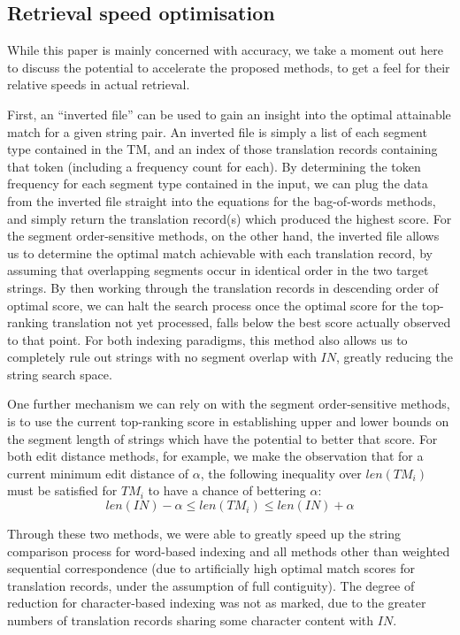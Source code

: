 \subsection{Retrieval speed optimisation}
\label{sec:speed}

While this paper is mainly concerned with accuracy, we take a moment out
here to discuss the potential to accelerate the proposed methods, to get a
feel for their relative speeds in actual retrieval.

First, an ``inverted file'' can be used to gain an insight into the
optimal attainable match for a given string pair. An inverted file is
simply a list of each segment type contained in the TM, and an index of
those translation records containing that token (including a frequency
count for each). By determining the token frequency for each segment
type contained in the input, we can plug the data from the inverted file
straight into the equations for the bag-of-words methods, and simply
return the translation record(s) which produced the highest score. For
the segment order-sensitive methods, on the other hand, the inverted
file allows us to determine the optimal match achievable with each
translation record, by assuming that overlapping segments occur in
identical order in the two target strings. By then working through the
translation records in descending order of optimal score, we can halt
the search process once the optimal score for the top-ranking
translation not yet processed, falls below the best score actually
observed to that point. For both indexing paradigms, this method also
allows us to completely rule out strings with no segment overlap with
$IN$, greatly reducing the string search space.

One further mechanism we can rely on with the segment order-sensitive
methods, is to use the current top-ranking score in establishing upper
and lower bounds on the segment length of strings which have the potential to
better that score. For both edit distance methods, for example, we make
the observation that for a current minimum edit distance of $\alpha$,
the following inequality over $len(TM_i)$ must be satisfied for $TM_i$
to have a chance of bettering $\alpha$:
\begin{equation}
  \label{eq:edist_bounds}
  len(IN) - \alpha \le len(TM_i) \le len(IN) + \alpha
\end{equation}

Through these two methods, we were able to greatly speed up the string
comparison process for word-based indexing and all methods other than
weighted sequential correspondence (due to artificially high optimal
match scores for translation records, under the assumption of full
contiguity). The degree of reduction for character-based indexing was
not as marked, due to the greater numbers of translation records sharing
some character content with $IN$.





